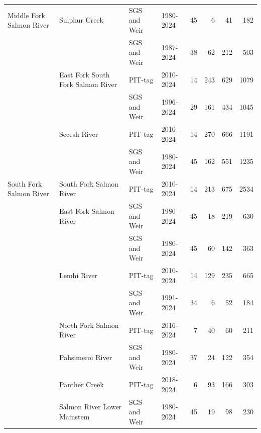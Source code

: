 \documentclass[10pt,a4paper]{article}
\begin{document}
\begin{table}
\begin{tabular}[t]{llllrrrr}
\multirow[t]{-11}{*}[8\dimexpr\aboverulesep+\belowrulesep+\cmidrulewidth]{\raggedright\arraybackslash Middle Fork Salmon River} & Sulphur Creek & SGS and Weir & 1980-2024 & 45 & 6 & 41 & 182\\

 &  & SGS and Weir & 1987-2024 & 38 & 62 & 212 & 503\\

 & \multirow[t]{-2}{*}{\raggedright\arraybackslash East Fork South Fork Salmon River} & PIT-tag & 2010-2024 & 14 & 243 & 629 & 1079\\

 &  & SGS and Weir & 1996-2024 & 29 & 161 & 434 & 1045\\

 & \multirow[t]{-2}{*}{\raggedright\arraybackslash Secesh River} & PIT-tag & 2010-2024 & 14 & 270 & 666 & 1191\\

 &  & SGS and Weir & 1980-2024 & 45 & 162 & 551 & 1235\\

\multirow[t]{-6}{*}[2\dimexpr\aboverulesep+\belowrulesep+\cmidrulewidth]{\raggedright\arraybackslash South Fork Salmon River} & \multirow[t]{-2}{*}{\raggedright\arraybackslash South Fork Salmon River} & PIT-tag & 2010-2024 & 14 & 213 & 675 & 2534\\

 & East Fork Salmon River & SGS and Weir & 1980-2024 & 45 & 18 & 219 & 630\\

 &  & SGS and Weir & 1980-2024 & 45 & 60 & 142 & 363\\

 & \multirow[t]{-2}{*}{\raggedright\arraybackslash Lemhi River} & PIT-tag & 2010-2024 & 14 & 129 & 235 & 665\\

 &  & SGS and Weir & 1991-2024 & 34 & 6 & 52 & 184\\

 & \multirow[t]{-2}{*}{\raggedright\arraybackslash North Fork Salmon River} & PIT-tag & 2016-2024 & 7 & 40 & 60 & 211\\

 & Pahsimeroi River & SGS and Weir & 1980-2024 & 37 & 24 & 122 & 354\\

 & Panther Creek & PIT-tag & 2018-2024 & 6 & 93 & 166 & 303\\

 & Salmon River Lower Mainstem & SGS and Weir & 1980-2024 & 45 & 19 & 98 & 230\\


\end{tabular}
\end{table}
\end{document}

